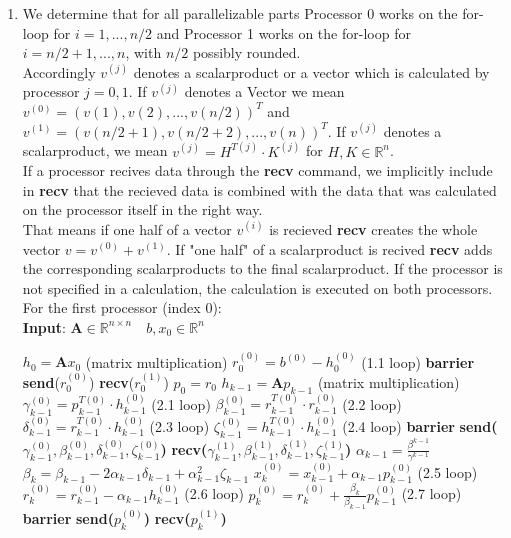 \documentclass{article}
\begin{document}
\begin{enumerate}[label=(\alph*)]
  \item We determine that for all parallelizable parts Processor 0 works on the for-loop for $i = 1,...,n/2$ and Processor 1 works on the for-loop for $i = n/2+1,...,n$, with $n/2$ possibly rounded.\\
Accordingly $v^{(j)}$ denotes a scalarproduct or a vector which is calculated by processor $j = 0, 1$. 
If $v^{(j)}$ denotes a Vector we mean $v^{(0)} = (v(1), v(2), ..., v(n/2))^T$ and $v^{(1)} = (v(n/2+1), v(n/2+2), ..., v(n))^T$.
If $v^{(j)}$ denotes a scalarproduct, we mean $v^{(j)} = H^{T(j)} \cdot K^{(j)}$ for $H, K \in \mathbb{R}^n$.\\
If a processor recives data through the \textbf{recv} command, we implicitly include in \textbf{recv} that the recieved data is combined with the data that was calculated on the processor itself in the right way. \\
That means if one half of a vector $v^{(i)}$ is recieved \textbf{recv} creates the whole vector $v=v^{(0)}+v^{(1)}$. If "one half" of a scalarproduct is recived \textbf{recv} adds the corresponding scalarproducts to the final scalarproduct.
If the processor is not specified in a calculation, the calculation is executed on both processors.
\\
For the first processor (index 0):
\\
    \textbf{Input}: $ \textbf{A} \in \mathbb{R}^{n\times n} \quad b, x_0\in \mathbb{R}^n$ 
    \begin{algorithmic}[1]
	\State $h_{0} = \textbf{A}x_{0}$ (matrix multiplication)
	\State $r_0^{(0)} = b^{(0)} - h_0^{(0)}$ (1.1 loop)
	\State \textbf{barrier}
	\State \textbf{send}($r_0^{(0)}$)
	\State \textbf{recv}($r_0^{(1)}$)
	\State $p_0 = r_0$
	\State $h_{k-1} = \textbf{A}p_{k-1}$ (matrix multiplication)
	\State $\gamma_{k-1}^{(0)} = p^{T(0)}_{k-1}\cdot h_{k-1}^{(0)}$ (2.1 loop)
	\State $\beta_{k-1}^{(0)} = r^{T(0)}_{k-1}\cdot r_{k-1}^{(0)}$ (2.2 loop)
	\State $\delta_{k-1}^{(0)} = r^{T(0)}_{k-1}\cdot h_{k-1}^{(0)}$ (2.3 loop)
	\State $\zeta_{k-1}^{(0)} = h^{T(0)}_{k-1}\cdot h_{k-1}^{(0)}$ (2.4 loop)
	\State \textbf{barrier}
      	\State \textbf{send($\gamma_{k-1}^{(0)}, \beta_{k-1}^{(0)}, \delta_{k-1}^{(0)}, \zeta_{k-1}^{(0)}$)}
      	\State \textbf{recv($\gamma_{k-1}^{(1)}, \beta_{k-1}^{(1)}, \delta_{k-1}^{(1)}, \zeta_{k-1}^{(1)}$)}
	\State $\alpha_{k-1} = \frac{\beta^{k-1}}{\gamma^{k-1}}$
	\State $\beta_{k} = \beta_{k-1} - 2 \alpha_{k-1} \delta_{k-1} + \alpha_{k-1}^2\zeta_{k-1}$
	\State $x_k^{(0)} = x_{k-1}^{(0)} + \alpha_{k-1}p_{k-1}^{(0)}$ (2.5 loop)
	\State $r_k^{(0)} = r_{k-1}^{(0)} - \alpha_{k-1}h_{k-1}^{(0)}$ (2.6 loop)
	\State $p_k^{(0)} = r_{k}^{(0)} + \frac{\beta_k}{\beta_{k-1}}p_{k-1}^{(0)}$ (2.7 loop)
	\State \textbf{barrier}
	\State \textbf{send($p_{k}^{(0)} $)}
	\State \textbf{recv($p_{k}^{(1)} $)}  	  	
	\EndFor
    \end{algorithmic} 


\end{enumerate}
\end{document}
